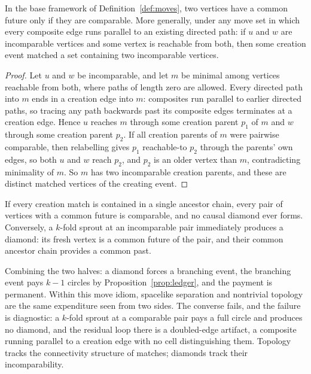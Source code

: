\begin{proposition}
\label{prop:diamondbranching}
In the base framework of Definition~\ref{def:moves}, two vertices have a common future only if they are comparable.
More generally, under any move set in which every composite edge runs parallel to an existing directed path: if $u$ and $w$ are incomparable vertices and some vertex is reachable from both, then some creation event matched a set containing two incomparable vertices.
\end{proposition}

\begin{proof}
Let $u$ and $w$ be incomparable, and let $m$ be minimal among vertices reachable from both, where paths of length zero are allowed.
Every directed path into $m$ ends in a creation edge into $m$: composites run parallel to earlier directed paths, so tracing any path backwards past its composite edges terminates at a creation edge.
Hence $u$ reaches $m$ through some creation parent $p_1$ of $m$ and $w$ through some creation parent $p_2$.
If all creation parents of $m$ were pairwise comparable, then relabelling gives $p_1$ reachable-to $p_2$ through the parents' own edges, so both $u$ and $w$ reach $p_2$, and $p_2$ is an older vertex than $m$, contradicting minimality of $m$.
So $m$ has two incomparable creation parents, and these are distinct matched vertices of the creating event.
\end{proof}

\begin{corollary}
\label{cor:diamondcircle}
If every creation match is contained in a single ancestor chain, every pair of vertices with a common future is comparable, and no causal diamond ever forms.
Conversely, a $k$-fold sprout at an incomparable pair immediately produces a diamond: its fresh vertex is a common future of the pair, and their common ancestor chain provides a common past.
\end{corollary}

Combining the two halves: a diamond forces a branching event, the branching event pays $k-1$ circles by Proposition~\ref{prop:ledger}, and the payment is permanent.
Within this move idiom, spacelike separation and nontrivial topology are the same expenditure seen from two sides.
The converse fails, and the failure is diagnostic: a $k$-fold sprout at a comparable pair pays a full circle and produces no diamond, and the residual loop there is a doubled-edge artifact, a composite running parallel to a creation edge with no cell distinguishing them.
Topology tracks the connectivity structure of matches; diamonds track their incomparability.

